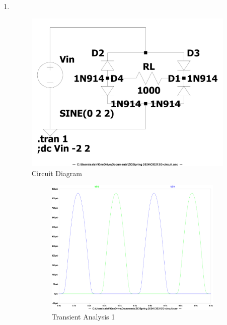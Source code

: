 \documentclass{zc-ust-hw}
\begin{document}
\begin{enumerate}
  \item \,
    \begin{figure}[H]
      \centering
      \includegraphics[width=0.95\textwidth]{figures/3-circuit.pdf}
      \caption{Circuit Diagram}
    \end{figure}
    \begin{figure}[H]
      \centering
      \begin{subfigure}{0.45\textwidth}
        \centering
        \includegraphics[width=\textwidth]{figures/3-transient-1.pdf}
        \caption{Transient Analysis 1}
      \end{subfigure}%
      \vspace{1cm}
      \begin{subfigure}{0.45\textwidth}

\end{subfigure}
\end{figure}
\end{enumerate}
\end{document}

